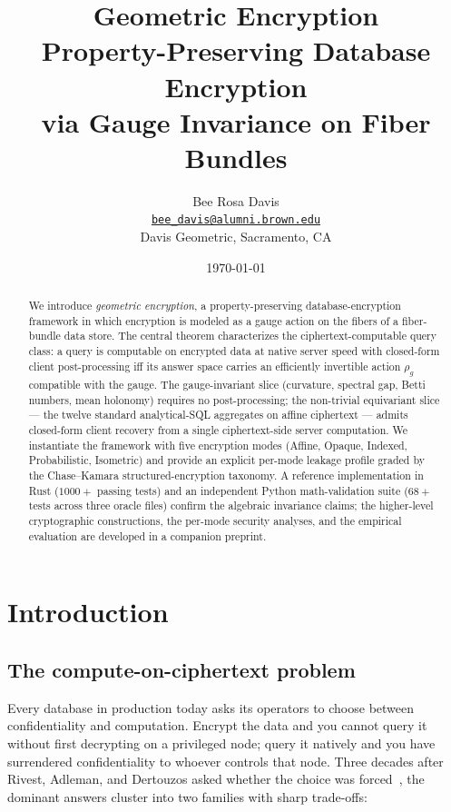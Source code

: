 \documentclass[11pt,letterpaper]{article}
\title{\textbf{Geometric Encryption} \\[6pt]
\large Property-Preserving Database Encryption \\
via Gauge Invariance on Fiber Bundles}
\author{Bee Rosa Davis \\
\href{mailto:bee_davis@alumni.brown.edu}{\nolinkurl{bee_davis@alumni.brown.edu}} \\
Davis Geometric, Sacramento, CA}
\date{\today}
\begin{document}
\maketitle

\begin{abstract}
\noindent We introduce \emph{geometric encryption}, a
property-preserving database-encryption framework in which
encryption is modeled as a gauge action on the fibers of a
fiber-bundle data store. The central theorem characterizes the
ciphertext-computable query class: a query is computable on
encrypted data at native server speed with closed-form client
post-processing iff its answer space carries an efficiently
invertible action $\rho_g$ compatible with the gauge. The
gauge-invariant slice (curvature, spectral gap, Betti numbers,
mean holonomy) requires no post-processing; the non-trivial
equivariant slice --- the twelve standard analytical-SQL
aggregates on affine ciphertext --- admits closed-form client
recovery from a single ciphertext-side server computation. We
instantiate the framework with five encryption modes (Affine,
Opaque, Indexed, Probabilistic, Isometric) and provide an
explicit per-mode leakage profile graded by the Chase--Kamara
structured-encryption taxonomy. A reference implementation in
Rust ($1000+$ passing tests) and an independent Python
math-validation suite ($68+$ tests across three oracle files)
confirm the algebraic invariance claims; the higher-level
cryptographic constructions, the per-mode security analyses, and
the empirical evaluation are developed in a companion preprint.
\end{abstract}

\newpage
\tableofcontents
\newpage


\section{Introduction}
\label{sec:intro}

\subsection{The compute-on-ciphertext problem}
\label{sec:intro:problem}

Every database in production today asks its operators to choose
between confidentiality and computation. Encrypt the data and you
cannot query it without first decrypting on a privileged node; query
it natively and you have surrendered confidentiality to whoever
controls that node. Three decades after Rivest, Adleman, and
Dertouzos asked whether the choice was forced~\cite{gentry2009fhe},
the dominant answers cluster into two families with sharp
trade-offs:
\end{document}
